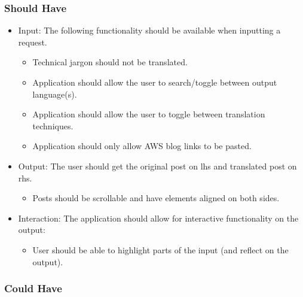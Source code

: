 \noindent \subsubsection*{Should Have}

\begin{itemize}
\item Input: The following functionality should be available when inputting a request.
\begin{itemize}
\item Technical jargon should not be translated.
\item Application should allow the user to search/toggle between output language(s).
\item Application should allow the user to toggle between translation techniques.
\item Application should only allow AWS blog links to be pasted.
\end{itemize}
\item Output: The user should get the original post on \acrshort{lhs} and translated post on \acrshort{rhs}.
\begin{itemize}
\item Posts should be scrollable and have elements aligned on both sides.
\end{itemize}
\item Interaction: The application should allow for interactive functionality on the output:
\begin{itemize}
\item User should be able to highlight parts of the input (and reflect on the output).
\end{itemize}
\end{itemize}

\noindent \subsubsection*{Could Have}

